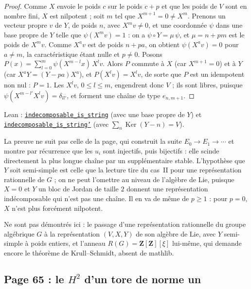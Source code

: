 \begin{proof}
Comme $X$ envoie le poids $c$ sur le poids $c + p$ et que les poids de $V$ sont en nombre fini, $X$ est nilpotent ; soit $m$ tel que $X^{m+1} = 0 \neq X^m$. Prenons un vecteur propre $v$ de $Y$, de poids $n$, avec $X^m v \neq 0$, et une coordonnée $\psi$ dans une base propre de $Y$ telle que $\psi(X^m v) = 1$ : on a $\psi \circ Y = \mu\, \psi$, et $\mu = n + pm$ est le poids de $X^m v$. Comme $X^a v$ est de poids $n + pa$, on obtient $\psi(X^a v) = 0$ pour $a \neq m$, la caractéristique étant nulle et $p \neq 0$. Posons $P(x) = \sum_{l=0}^{m} \psi(X^{m-l} x)\, X^l v$. Alors $P$ commute à $X$ (car $X^{m+1} = 0$) et à $Y$ (car $X^{a} Y = (Y - pa) X^{a}$), et $P(X^l v) = X^l v$, de sorte que $P$ est un idempotent non nul : $P = 1$. Les $X^l v$, $0 \leq l \leq m$, engendrent donc $V$ ; ils sont libres, puisque $\psi(X^{m-l'} X^l v) = \delta_{l l'}$, et forment une chaîne de type $e_{n,m+1}$.
\end{proof}

\noindent Lean : \href{\leanblobmain/RepresentationTheory/Folder10.lean}{\texttt{indecomposable\_is\_string}} (avec une base propre de $Y$) et \href{\leanblobmain/RepresentationTheory/Folder10.lean}{\texttt{indecomposable\_is\_string'}} (avec $\sum_n \operatorname{Ker}(Y - n) = V$).

\begin{remarque}
La preuve ne suit pas celle de la page, qui construit la suite $E_0 \to E_1 \to \cdots$ et montre par récurrence que les $u_i$ sont injectifs, puis bijectifs : elle scinde directement la plus longue chaîne par un supplémentaire stable. L'hypothèse que $Y$ soit semi-simple est celle que la lecture tire du cas~II pour une représentation rationnelle de $G$ ; on ne peut l'omettre au niveau de l'algèbre de Lie, puisque $X = 0$ et $Y$ un bloc de Jordan de taille $2$ donnent une représentation indécomposable qui n'est pas une chaîne. Il en va de même de $p \geq 1$ : pour $p = 0$, $X$ n'est plus forcément nilpotent.
\end{remarque}

Ne sont pas démontrés ici : le passage d'une représentation rationnelle du groupe algébrique $G$ à la représentation $(V, X, Y)$ de son algèbre de Lie, avec $Y$ semi-simple à poids entiers, et l'anneau $R(G) = \mathbf Z[\mathbf Z][\xi]$ lui-même, qui demande encore le théorème de Krull--Schmidt, absent de mathlib.

\subsection*{Page 65 : le $H^2$ d'un tore de norme un}

